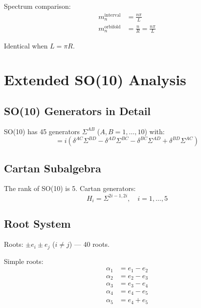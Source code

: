 \documentclass[11pt,a4paper]{article}
\begin{document}
Spectrum comparison:
\begin{align}
  m_n^{\text{interval}} &= \frac{n\pi}{L}
  \label{eq:app-spectrum-interval} \\
  m_n^{\text{orbifold}} &= \frac{n}{R} = \frac{n\pi}{L}
  \label{eq:app-spectrum-orbifold}
\end{align}

Identical when $L = \pi R$.

\section{Extended SO(10) Analysis}
\label{app:so10-extended}

\subsection{SO(10) Generators in Detail}

SO(10) has 45 generators $\Sigma^{AB}$ ($A,B = 1,\ldots,10$) with:
\begin{equation}
  [\Sigma^{AB}, \Sigma^{CD}] = i(\delta^{AC}\Sigma^{BD} - \delta^{AD}\Sigma^{BC}
    - \delta^{BC}\Sigma^{AD} + \delta^{BD}\Sigma^{AC})
  \label{eq:app-so10-algebra}
\end{equation}

\subsection{Cartan Subalgebra}

The rank of SO(10) is 5. Cartan generators:
\begin{equation}
  H_i = \Sigma^{2i-1,2i}, \quad i = 1,\ldots,5
  \label{eq:app-so10-cartan}
\end{equation}

\subsection{Root System}

Roots: $\pm e_i \pm e_j$ ($i \neq j$) --- 40 roots.

Simple roots:
\begin{align}
  \alpha_1 &= e_1 - e_2
  \label{eq:alpha1} \\
  \alpha_2 &= e_2 - e_3
  \label{eq:alpha2} \\
  \alpha_3 &= e_3 - e_4
  \label{eq:alpha3} \\
  \alpha_4 &= e_4 - e_5
  \label{eq:alpha4} \\
  \alpha_5 &= e_4 + e_5
  \label{eq:alpha5}
\end{align}
\end{document}
